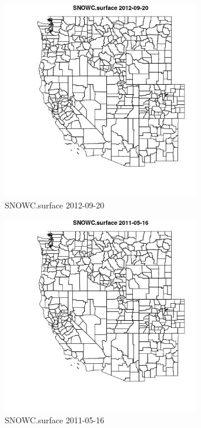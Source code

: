 \begin{figure} 
\centering  
\includegraphics[width=0.77\textwidth]{Code_Outputs/ML_input_report_ML_input_PM25_Step5_part_d_de_duplicated_aves_ML_input_MapObsSNOWCsurface2012-09-20.jpg} 
\caption{\label{fig:ML_input_report_ML_input_PM25_Step5_part_d_de_duplicated_aves_ML_inputMapObsSNOWCsurface2012-09-20}SNOWC.surface 2012-09-20} 
\end{figure} 
 

\begin{figure} 
\centering  
\includegraphics[width=0.77\textwidth]{Code_Outputs/ML_input_report_ML_input_PM25_Step5_part_d_de_duplicated_aves_ML_input_MapObsSNOWCsurface2011-05-16.jpg} 
\caption{\label{fig:ML_input_report_ML_input_PM25_Step5_part_d_de_duplicated_aves_ML_inputMapObsSNOWCsurface2011-05-16}SNOWC.surface 2011-05-16} 
\end{figure} 
 

